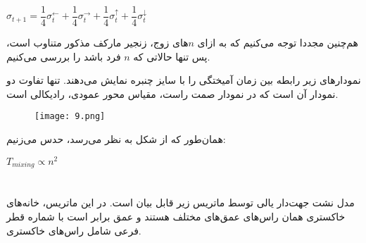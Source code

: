 \documentclass{scribe-cgenomics}
\begin{document}
\begin{center}
$
\sigma_{t+1} = 
\dfrac{1}{4} \sigma_{t}^{\leftarrow} + 
\dfrac{1}{4} \sigma_{t}^{\rightarrow} + 
\dfrac{1}{4} \sigma_{t}^{\uparrow} + 
\dfrac{1}{4} \sigma_{t}^{\downarrow} 
$
\end{center}

هم‌چنین مجددا توجه می‌کنیم که به ازای
$n$های
زوج، زنجیر مارکف مذکور متناوب است، پس تنها حالاتی که
$n$
فرد باشد را بررسی می‌کنیم.

نمودارهای زیر رابطه بین زمان آمیختگی را با سایز چنبره نمایش می‌دهند. تنها تفاوت دو نمودار آن است که در نمودار صمت راست، مقیاس محور عمودی، رادیکالی است. 

\begin{figure}[h]\label{9}
\texttt{[image: 9.png]}
\centering
\end{figure}

همان‌طور که از شکل به نظر می‌رسد، حدس می‌زنیم:

\begin{center}
$T_{mixing} \propto n ^ 2$
\end{center}


\newpage
\section{}

مدل نشت جهت‌دار یالی توسط ماتریس زیر قابل بیان است. در این ماتریس، خانه‌های خاکستری همان راس‌های عمق‌های مختلف هستند و عمق برابر است با شماره قطر فرعی شامل راس‌های خاکستری. 

\begin{center}
\end{center}
\end{document}
